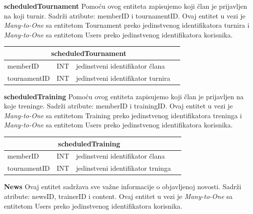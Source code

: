 \documentclass{article}
\begin{document}
	
	
	
	
	\textbf{scheduledTournament} Pomoću ovog entiteta zapisujemo koji član je prijavljen na koji turnir. Sadrži atribute: memberID i tournamentID. Ovaj entitet u vezi je \textit{Many-to-One} sa entitetom Tournament preko jedinstvenog identifikatora turnira i \textit{Many-to-One} sa entitetom Users preko jedinstvenog identifikatora korisnika.
		\\
		\bigskip
	
	
\begin{center}
    \begin{tabular}{ | l | l | l | p{5cm} |}
    \hline
    \multicolumn{3}{|c|}{scheduledTournament}  \\ \hline
   \cellcolor{green!25}memberID & INT & jedinstveni identifikator člana \\ \hline
    \cellcolor{green!25}tournamentID & INT & jedinstveni identifikator turnira \\ \hline
    \end{tabular}
\end{center}
\bigskip
\bigskip


\textbf{scheduledTraining} Pomoću ovog entiteta zapisujemo koji član je prijavljen na koje treninge. Sadrži atribute: memberID i trainingID. Ovaj entitet u vezi je \textit{Many-to-One} sa entitetom Training preko jedinstvenog identifikatora treninga i \textit{Many-to-One} sa entitetom Users preko jedinstvenog identifikatora korisnika.
		\\



\begin{center}
    \begin{tabular}{ | l | l | l | p{5cm} |}
    \hline
    \multicolumn{3}{|c|}{scheduledTraining}  \\ \hline
   \cellcolor{green!25}memberID & INT & jedinstveni identifikator člana \\ \hline
    \cellcolor{green!25}tournamentID & INT & jedinstveni identifikator trninga \\ \hline 
    \end{tabular}
\end{center}
\bigskip
\bigskip


\textbf{News} Ovaj entitet sadržava sve važne informacije o objavljenoj novosti. Sadrži atribute: newsID, trainerID i content. Ovaj entitet u vezi je \textit{Many-to-One} sa entitetom Users preko jedinstvenog identifikatora korisnika.
		\\
\end{document}
